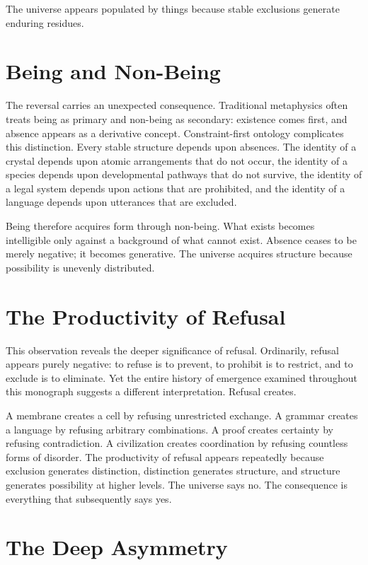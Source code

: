 \documentclass[11pt,oneside]{book}
\theoremstyle{plain}
\theoremstyle{definition}
\theoremstyle{remark}
\begin{document}
The universe appears populated by things because stable exclusions generate enduring residues.

\section{Being and Non-Being}

The reversal carries an unexpected consequence. Traditional metaphysics often treats being as primary and non-being as secondary: existence comes first, and absence appears as a derivative concept. Constraint-first ontology complicates this distinction. Every stable structure depends upon absences. The identity of a crystal depends upon atomic arrangements that do not occur, the identity of a species depends upon developmental pathways that do not survive, the identity of a legal system depends upon actions that are prohibited, and the identity of a language depends upon utterances that are excluded.

Being therefore acquires form through non-being. What exists becomes intelligible only against a background of what cannot exist. Absence ceases to be merely negative; it becomes generative. The universe acquires structure because possibility is unevenly distributed.

\section{The Productivity of Refusal}

This observation reveals the deeper significance of refusal. Ordinarily, refusal appears purely negative: to refuse is to prevent, to prohibit is to restrict, and to exclude is to eliminate. Yet the entire history of emergence examined throughout this monograph suggests a different interpretation. Refusal creates.

A membrane creates a cell by refusing unrestricted exchange. A grammar creates a language by refusing arbitrary combinations. A proof creates certainty by refusing contradiction. A civilization creates coordination by refusing countless forms of disorder. The productivity of refusal appears repeatedly because exclusion generates distinction, distinction generates structure, and structure generates possibility at higher levels. The universe says no. The consequence is everything that subsequently says yes.

\section{The Deep Asymmetry}
\end{document}
